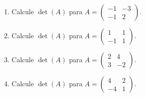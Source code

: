 \documentclass[12pt]{article}
\theoremstyle{remark}
\newcounter{contadorEjercicio}
\newenvironment{listaejercicios}{\begin{enumerate}[label=\textbf{E\arabic*.},leftmargin=2.4em,itemsep=0.52em]\setcounter{enumi}{\value{contadorEjercicio}}}{\setcounter{contadorEjercicio}{\value{enumi}}\end{enumerate}}
\begin{document}
\begin{listaejercicios}
\item Calcule $\det(A)$ para $A=\begin{pmatrix}-1&-3\\-1&2\end{pmatrix}$.

\item Calcule $\det(A)$ para $A=\begin{pmatrix}1&1\\-1&1\end{pmatrix}$.

\item Calcule $\det(A)$ para $A=\begin{pmatrix}2&4\\3&-2\end{pmatrix}$.

\item Calcule $\det(A)$ para $A=\begin{pmatrix}4&2\\-4&1\end{pmatrix}$.

\end{listaejercicios}
\end{document}
